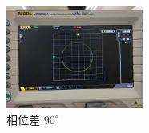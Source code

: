 \documentclass[a4paper,utf8]{article}
\begin{document}
    \begin{figure}[!ht]
        \begin{floatrow}[2]
        \end{floatrow}
    \end{figure}\par
    \begin{figure}[!ht]
        \includegraphics[width=0.4\textwidth]{6.jpg}
        \caption{相位差 $90^\circ$\label{fig:8.9}}
    \end{figure}
    
\end{document}
